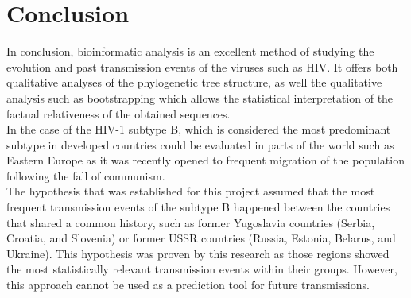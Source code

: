 \chapter{Conclusion}

In conclusion, bioinformatic analysis is an excellent method of studying the evolution and past transmission events of the viruses such as HIV. 
It offers both qualitative analyses of the phylogenetic tree structure, as well the qualitative analysis such as bootstrapping which allows the statistical interpretation of the factual relativeness of the obtained sequences. \\
In the case of the HIV-1 subtype B, which is considered the most predominant subtype in developed countries could be evaluated in parts of the world such as Eastern Europe as it was recently opened to frequent migration of the population following the fall of communism. \\
The hypothesis that was established for this project assumed that the most frequent transmission events of the subtype B happened between the countries that shared a common history, such as former Yugoslavia countries (Serbia, Croatia, and Slovenia) or former USSR countries (Russia, Estonia, Belarus, and Ukraine). 
This hypothesis was proven by this research as those regions showed the most statistically relevant transmission events within their groups. 
However, this approach cannot be used as a prediction tool for future transmissions.
